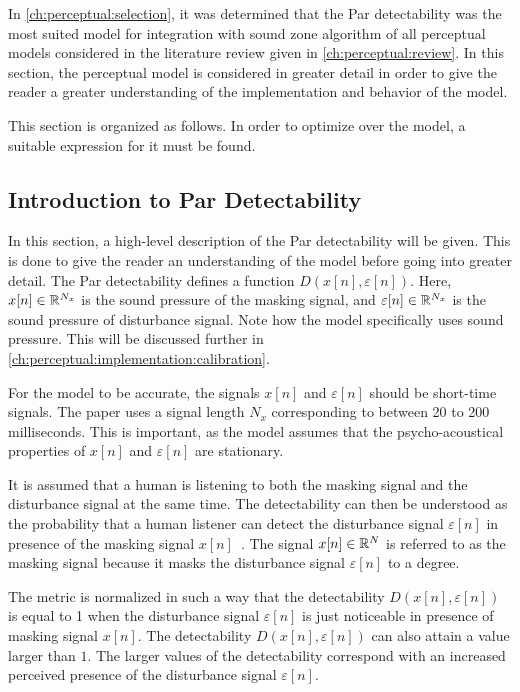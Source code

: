 In \autoref{ch:perceptual:selection}, it was determined that the Par detectability was the 
most suited model for integration with sound zone algorithm of all perceptual models considered in 
the literature review given in \autoref{ch:perceptual:review}.
In this section, the perceptual model is considered in greater detail in order to give the reader a greater
understanding of the implementation and behavior of the model.

This section is organized as follows.
In order to optimize over the model, a suitable expression for it must be found.

\subsection{Introduction to Par Detectability}
\label{ch:perceptual:implementation:intuition}
In this section, a high-level description of the Par detectability will be given.
This is done to give the reader an understanding of the model before going into greater detail.
The Par detectability defines a function $D(x[n],\varepsilon[n])$.
Here, $x[n]\in\mathbb{R}^{N_x}$ is the sound pressure of the masking signal, 
and $\varepsilon[n]\in\mathbb{R}^{N_x}$ is the sound pressure of disturbance signal.
Note how the model specifically uses sound pressure.
This will be discussed further in \autoref{ch:perceptual:implementation:calibration}.

For the model to be accurate, the signals $x[n]$ and $\varepsilon[n]$ should be short-time signals.
The paper uses a signal length $N_x$ corresponding to between 20 to 200 milliseconds.    
This is important, as the model assumes that the psycho-acoustical properties of $x[n]$ 
and $\varepsilon[n]$ are stationary.  

It is assumed that a human is listening to both the masking signal and the disturbance signal at the same time.
The detectability can then be understood as the probability that a human listener can detect the disturbance signal 
$\varepsilon[n]$ in presence of the masking signal $x[n]$~\cite{van2005perceptual}.
The signal $x[n]\in\mathbb{R}^{N}$ is referred to as the masking signal because it masks the disturbance signal 
$\varepsilon[n]$ to a degree.

The metric is normalized in such a way that the detectability $D(x[n],\varepsilon[n])$ is equal to 1 when the 
disturbance signal $\varepsilon[n]$ is just noticeable in presence of masking signal $x[n]$.
The detectability $D(x[n],\varepsilon[n])$ can also attain a value larger than $1$.
The larger values of the detectability correspond with an increased perceived presence of the
disturbance signal $\varepsilon[n]$.

